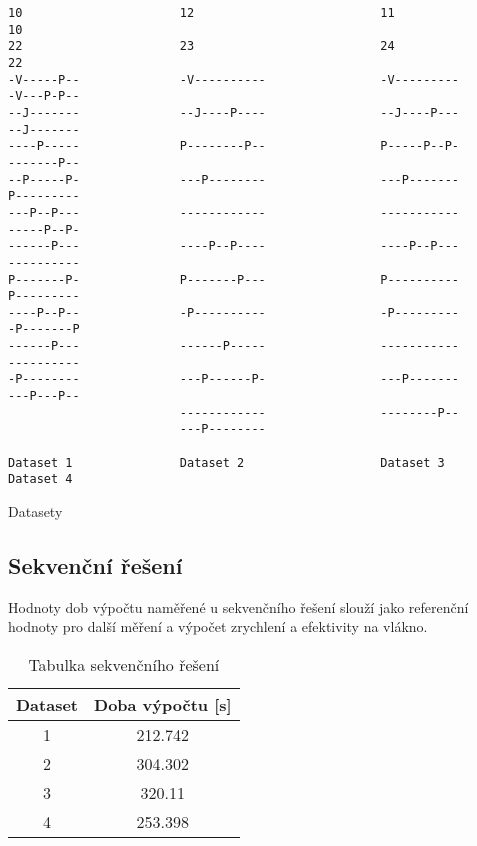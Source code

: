 \documentclass[a4paper,10pt]{article}
\begin{document}
\begin{listing}[H]
\begin{verbatim}
10                      12                          11                         10        
22                      23                          24                         22        
-V-----P--              -V----------                -V---------                -V---P-P--
--J-------              --J----P----                --J----P---                --J-------
----P-----              P--------P--                P-----P--P-                -------P--
--P-----P-              ---P--------                ---P-------                P---------
---P--P---              ------------                -----------                -----P--P-
------P---              ----P--P----                ----P--P---                ----------
P-------P-              P-------P---                P----------                P---------
----P--P--              -P----------                -P---------                -P-------P
------P---              ------P-----                -----------                ----------
-P--------              ---P------P-                ---P-------                ---P---P--
                        ------------                --------P--                
                        ---P--------                                                     

Dataset 1               Dataset 2                   Dataset 3                  Dataset 4
\end{verbatim}
\caption{Datasety}
\end{listing}

\subsection*{Sekvenční řešení}
Hodnoty dob výpočtu naměřené u sekvenčního řešení slouží jako referenční hodnoty pro další měření a výpočet zrychlení a efektivity na vlákno.

\begin{table}[H]
\centering
\begin{tabular}{|c|c|}
\hline
Dataset & Doba výpočtu {[}s{]} \\ \hline
1       & 212.742              \\
2       & 304.302              \\
3       & 320.11               \\
4       & 253.398              \\ \hline
\end{tabular}
\caption{Tabulka sekvenčního řešení}
\end{table}
\end{document}
